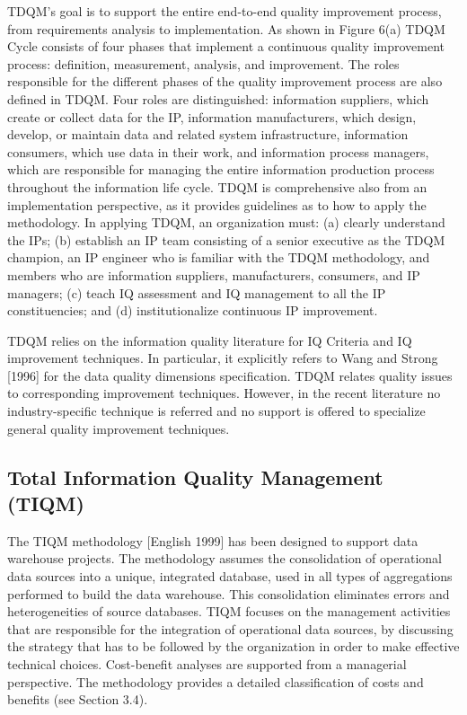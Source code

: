 \documentclass[pdftex,english,oribibl]{llncs}
\begin{document}
    TDQM’s goal is to support the entire end-to-end quality improvement process, from requirements analysis to implementation.
    As shown in Figure 6(a) TDQM Cycle consists of four phases that implement a continuous quality improvement process: definition, measurement, analysis, and improvement.
    The roles responsible for the different phases of the quality improvement process are also defined in TDQM.
    Four roles are distinguished: information suppliers, which create or collect data for the IP, information manufacturers, which design, develop, or maintain data and related system infrastructure, information consumers, which use data in their work, and information process managers, which are responsible for managing the entire information production process throughout the information life cycle.
    TDQM is comprehensive also from an implementation perspective, as it provides guidelines as to how to apply the methodology.
    In applying TDQM, an organization must:
    (a) clearly understand the IPs;
    (b) establish an IP team consisting of a senior executive as the TDQM champion, an IP engineer who is familiar with the TDQM methodology, and members who are information suppliers, manufacturers, consumers, and IP managers;
    (c) teach IQ assessment and IQ management to all the IP constituencies; and
    (d) institutionalize continuous IP improvement.

    TDQM relies on the information quality literature for IQ Criteria and IQ improvement techniques.
    In particular, it explicitly refers to Wang and Strong [1996] for the data quality dimensions specification.
    TDQM relates quality issues to corresponding improvement techniques.
    However, in the recent literature no industry-specific technique is referred and no support is offered to specialize general quality improvement techniques.


    \subsection{Total Information Quality Management (TIQM)}

    The TIQM methodology [English 1999] has been designed to support data warehouse projects. The methodology assumes the consolidation of operational data sources into a unique, integrated database, used in all types of aggregations performed to build the data warehouse. This consolidation eliminates errors and heterogeneities of source databases. TIQM focuses on the management activities that are responsible for the integration of operational data sources, by discussing the strategy that has to be followed by the organization in order to make effective technical choices. Cost-benefit analyses are supported from a managerial perspective. The methodology provides a detailed classification of costs and benefits (see Section 3.4).
\end{document}
